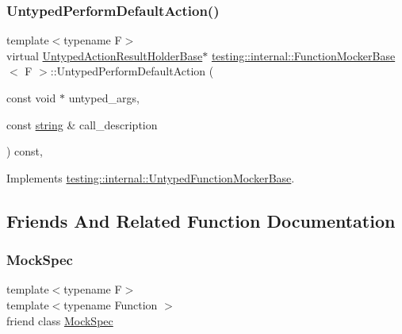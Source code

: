 \subsubsection{\texorpdfstring{Untyped\+Perform\+Default\+Action()}{UntypedPerformDefaultAction()}}
{\footnotesize\ttfamily template$<$typename F$>$ \\
virtual \hyperlink{classtesting_1_1internal_1_1_untyped_action_result_holder_base}{Untyped\+Action\+Result\+Holder\+Base}$\ast$ \hyperlink{classtesting_1_1internal_1_1_function_mocker_base}{testing\+::internal\+::\+Function\+Mocker\+Base}$<$ F $>$\+::Untyped\+Perform\+Default\+Action (\begin{DoxyParamCaption}\item[{const void $\ast$}]{untyped\+\_\+args,  }\item[{const \hyperlink{namespacetesting_1_1internal_a8e8ff5b11e64078831112677156cb111}{string} \&}]{call\+\_\+description }\end{DoxyParamCaption}) const\hspace{0.3cm}{\ttfamily [inline]}, {\ttfamily [virtual]}}



Implements \hyperlink{classtesting_1_1internal_1_1_untyped_function_mocker_base_a2cb149456cd559d5b0615f2310b235e3}{testing\+::internal\+::\+Untyped\+Function\+Mocker\+Base}.



\subsection{Friends And Related Function Documentation}
\mbox{\label{classtesting_1_1internal_1_1_function_mocker_base_ae72aeee91c93e8ae5e1ed7f726a766b2}} 
\subsubsection{\texorpdfstring{Mock\+Spec}{MockSpec}}
{\footnotesize\ttfamily template$<$typename F$>$ \\
template$<$typename Function $>$ \\
friend class \hyperlink{classtesting_1_1internal_1_1_mock_spec}{Mock\+Spec}\hspace{0.3cm}{\ttfamily [friend]}}


